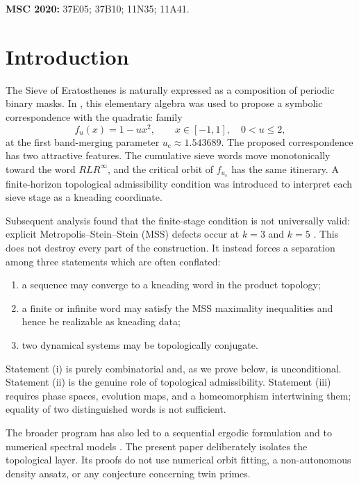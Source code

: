 \documentclass[11pt]{article}
\theoremstyle{definition}
\theoremstyle{remark}
\newcommand{\uc}{u_{\mathrm c}}
\begin{document}
\medskip
\noindent\textbf{MSC 2020:} 37E05; 37B10; 11N35; 11A41.

\section{Introduction}

The Sieve of Eratosthenes is naturally expressed as a composition of periodic binary masks.  In \citet{Wang2026Published}, this elementary algebra was used to propose a symbolic correspondence with the quadratic family
\begin{equation}\label{eq:quadratic-family}
    f_u(x)=1-u x^2, \qquad x\in[-1,1],\quad 0<u\le 2,
\end{equation}
at the first band-merging parameter $\uc\approx1.543689$.  The proposed correspondence has two attractive features.  The cumulative sieve words move monotonically toward the word $RLR^\infty$, and the critical orbit of $f_{\uc}$ has the same itinerary.  A finite-horizon topological admissibility condition was introduced to interpret each sieve stage as a kneading coordinate.

Subsequent analysis found that the finite-stage condition is not universally valid: explicit Metropolis--Stein--Stein (MSS) defects occur at $k=3$ and $k=5$ \citep{WangTransient2026}.  This does not destroy every part of the construction.  It instead forces a separation among three statements which are often conflated:
\begin{enumerate}[label=(\roman*)]
    \item a sequence may converge to a kneading word in the product topology;
    \item a finite or infinite word may satisfy the MSS maximality inequalities and hence be realizable as kneading data;
    \item two dynamical systems may be topologically conjugate.
\end{enumerate}
Statement (i) is purely combinatorial and, as we prove below, is unconditional.  Statement (ii) is the genuine role of topological admissibility.  Statement (iii) requires phase spaces, evolution maps, and a homeomorphism intertwining them; equality of two distinguished words is not sufficient.

The broader program has also led to a sequential ergodic formulation \citep{WangSequential2026} and to numerical spectral models \citep{WangSpectral2026,WangHenon2026}.  The present paper deliberately isolates the topological layer.  Its proofs do not use numerical orbit fitting, a non-autonomous density ansatz, or any conjecture concerning twin primes.
\end{document}
